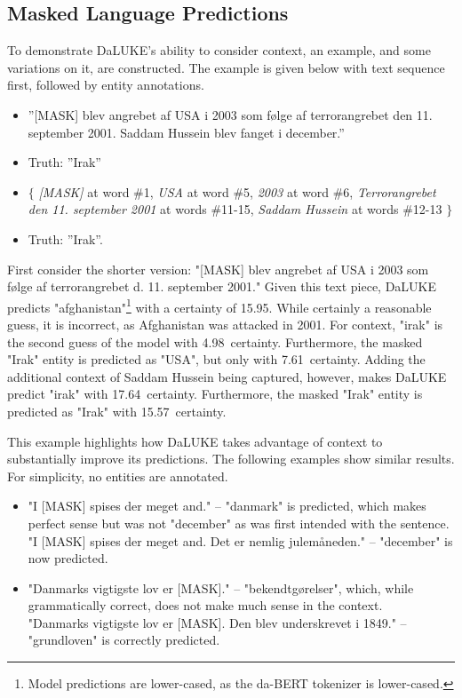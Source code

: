 \documentclass[main.tex]{subfiles}
\begin{document}
\subsection{Masked Language Predictions}
\label{subsec:mlmpreds}
To demonstrate DaLUKE's ability to consider context, an example, and some variations on it, are constructed.
The example is given below with text sequence first, followed by entity annotations.
\begin{itemize}
    \item ''[MASK] blev angrebet af USA i 2003 som følge af terrorangrebet den 11. september 2001. Saddam Hussein blev fanget i december.''
    \item[] Truth: ''Irak''
    \item $\{$ \emph{[MASK]} at word \#1,
            \subitem \emph{USA} at word \#5,
            \subitem \emph{2003} at word \#6,
            \subitem \emph{Terrorangrebet den 11. september 2001} at words \#11-15,
            \subitem \emph{Saddam Hussein} at words \#12-13
        $\}$
    \item[] Truth: ''Irak''.
\end{itemize}
First consider the shorter version: "[MASK] blev angrebet af USA i 2003 som følge af terrorangrebet d. 11. september 2001."
Given this text piece, DaLUKE predicts "afghanistan"\footnote{Model predictions are lower-cased, as the da-BERT tokenizer is lower-cased.} with a certainty of 15.95\pro.
While certainly a reasonable guess, it is incorrect, as Afghanistan was attacked in 2001.
For context, "irak" is the second guess of the model with 4.98\pro\ certainty.
Furthermore, the masked "Irak" entity is predicted as "USA", but only with 7.61\pro~certainty.
Adding the additional context of Saddam Hussein being captured, however, makes DaLUKE predict "irak" with 17.64\pro~certainty.
Furthermore, the masked "Irak" entity is predicted as "Irak" with 15.57\pro~certainty.

This example highlights how DaLUKE takes advantage of context to substantially improve its predictions.
The following examples show similar results.
For simplicity, no entities are annotated.
\begin{itemize}
    \item "I [MASK] spises der meget and." -- "danmark" is predicted, which makes perfect sense but was not "december" as was first intended with the sentence.\\
    "I [MASK] spises der meget and. Det er nemlig julemåneden." -- "december" is now predicted.
    \item "Danmarks vigtigste lov er [MASK]." -- "bekendtgørelser", which, while grammatically correct, does not make much sense in the context.\\
    "Danmarks vigtigste lov er [MASK]. Den blev underskrevet i 1849." -- "grundloven" is correctly predicted.
\end{itemize}
\end{document}
